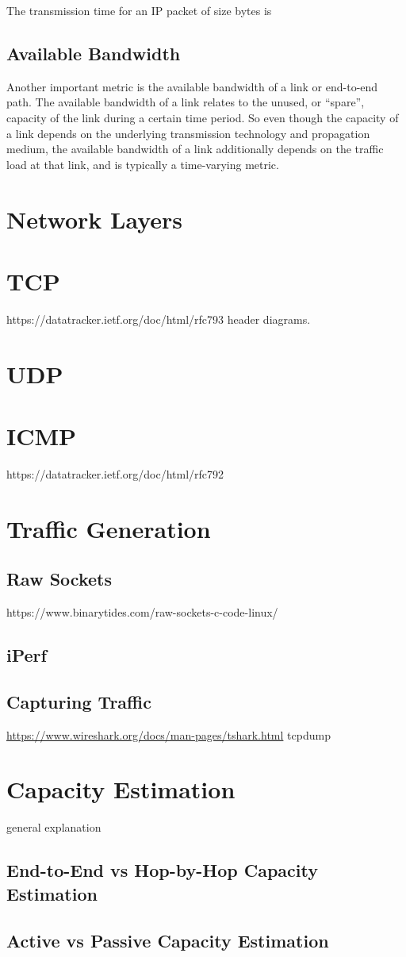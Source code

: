 
The transmission time for an IP packet of size bytes is

\subsection*{Available Bandwidth}
Another important metric is the available bandwidth of a link or end-to-end path. The available bandwidth of a link relates to the unused, or “spare”, capacity of the link during a certain time period. So even though the capacity of a link depends on the underlying transmission technology and propagation medium, the available bandwidth of a link additionally depends on the traffic load at that link, and is typically a time-varying metric.

\section{Network Layers}

\section{TCP}
https://datatracker.ietf.org/doc/html/rfc793
header diagrams.

\section{UDP}

\section{ICMP}
\label{icmp_section}
https://datatracker.ietf.org/doc/html/rfc792

\section{Traffic Generation}

\subsection*{Raw Sockets}
https://www.binarytides.com/raw-sockets-c-code-linux/


\subsection*{iPerf}

\subsection*{Capturing Traffic}
\url{https://www.wireshark.org/docs/man-pages/tshark.html}
tcpdump

\section{Capacity Estimation}
general explanation

\subsection{End-to-End vs Hop-by-Hop Capacity Estimation}

\subsection{Active vs Passive Capacity Estimation}